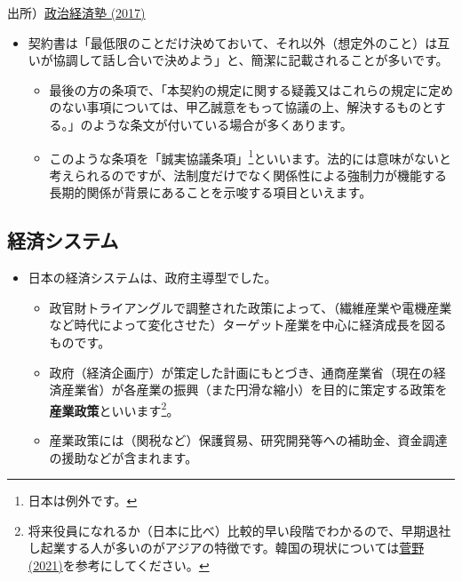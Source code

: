 \documentclass[
]{book}
\begin{document}
出所）\href{https://www.seijikeizaijuku.com/naikaku.html}{政治経済塾 (2017)}

\begin{itemize}
\item
  契約書は「最低限のことだけ決めておいて、それ以外（想定外のこと）は互いが協調して話し合いで決めよう」と、簡潔に記載されることが多いです。

  \begin{itemize}
  \item
    最後の方の条項で、「本契約の規定に関する疑義又はこれらの規定に定めのない事項については、甲乙誠意をもって協議の上、解決するものとする。」のような条文が付いている場合が多くあります。
  \item
    このような条項を「誠実協議条項」\footnote{日本は例外です。}といいます。法的には意味がないと考えられるのですが、法制度だけでなく関係性による強制力が機能する長期的関係が背景にあることを示唆する項目といえます。
  \end{itemize}
\end{itemize}

\hypertarget{japan-economy}{%
\subsection{経済システム}\label{japan-economy}}

\begin{itemize}
\item
  日本の経済システムは、政府主導型でした。

  \begin{itemize}
  \item
    政官財トライアングルで調整された政策によって、（繊維産業や電機産業など時代によって変化させた）ターゲット産業を中心に経済成長を図るものです。
  \item
    政府（経済企画庁）が策定した計画にもとづき、通商産業省（現在の経済産業省）が各産業の振興（また円滑な縮小）を目的に策定する政策を\textbf{産業政策}といいます\footnote{将来役員になれるか（日本に比べ）比較的早い段階でわかるので、早期退社し起業する人が多いのがアジアの特徴です。韓国の現状については\href{https://toyokeizai.net/articles/-/473559}{菅野 (2021)}を参考にしてください。}。
  \item
    産業政策には（関税など）保護貿易、研究開発等への補助金、資金調達の援助などが含まれます。
  \end{itemize}
\end{itemize}
\end{document}
